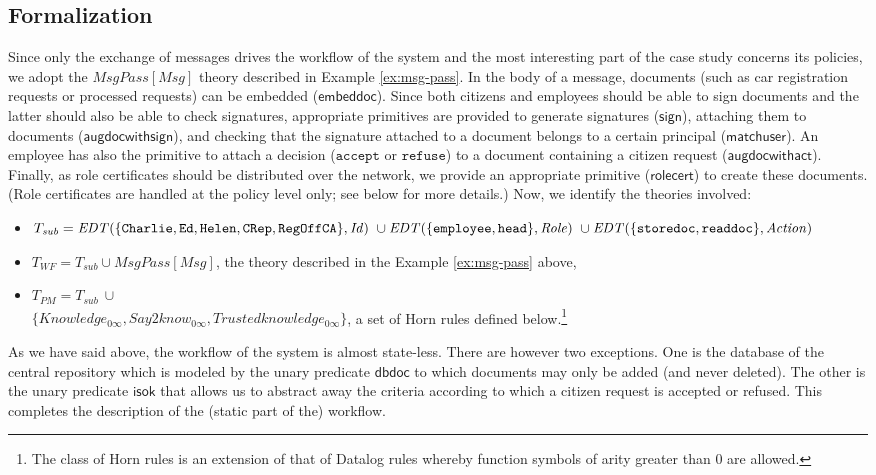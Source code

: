 \documentclass[conference]{IEEEtran}
\begin{document}
\begin{LONG}
\subsection*{Formalization}
Since only the exchange of messages drives the workflow of the system
and the most interesting part of the case study concerns its policies, 
we adopt the $\mathit{MsgPass}[\mathit{Msg}]$ theory described in Example \ref{ex:msg-pass}. 
In the body of a message, documents (such as car
registration requests or processed requests) can be embedded
($\mathsf{embeddoc}$).  Since both citizens and employees should be able
to sign documents and the latter should also be able to check
signatures, appropriate primitives  are provided to generate signatures
($\mathsf{sign}$), attaching them to documents
($\mathsf{augdocwithsign}$), and checking that the signature attached to
a document belongs to a certain principal ($\mathsf{matchuser}$).  An employee has also the primitive to attach a decision
($\mathtt{accept}$ or $\mathtt{refuse}$) to a document containing a
citizen request ($\mathsf{augdocwithact}$).  Finally, as role
certificates should be distributed over the network, we provide an
appropriate primitive ($\mathsf{rolecert}$) to create these documents.
(Role certificates are handled at the policy level only; see below for
more details.)
Now, we identify the theories involved:
\begin{itemize}
\item $T_\mathit{sub} = \\
\mathit{EDT}(\{\mathtt{Charlie}, \mathtt{Ed} , \mathtt{Helen}, \mathtt{CRep}, \mathtt{RegOffCA}\}, \mathit{Id}) ~ \cup \\
\mathit{EDT}(\{\mathtt{employee}, \mathtt{head} \} , \mathit{Role}) ~ \cup \\
\mathit{EDT}(\{\mathtt{storedoc}, \mathtt{readdoc} \} , \mathit{Action})$
\item $T_\mathit{WF} = T_\mathit{sub} \cup \mathit{MsgPass}[\mathit{Msg}]$, the theory described in the Example \ref{ex:msg-pass} above,
\item $T_\mathit{PM} = T_\mathit{sub} ~\cup$ \\
  $\{Knowledge_{0\infty}, Say2know_{0\infty},
  Trustedknowledge_{0\infty}\}$, a set of Horn rules defined
  below.\footnote{The class of Horn rules is an extension of that of
    Datalog rules whereby function symbols of arity greater than $0$
    are allowed.}
\end{itemize}
As we have said above, the workflow of the system is almost state-less.
There are however two exceptions.  One is the database of the central
repository which is modeled by the unary predicate $\mathsf{dbdoc}$ to
which documents may only be added (and never deleted).  The other is
the unary predicate $\mathsf{isok}$ that allows us to abstract away the
criteria according to which a citizen request is accepted or refused.
This completes the description of the (static part of the) workflow.


\end{LONG}
\end{document}
